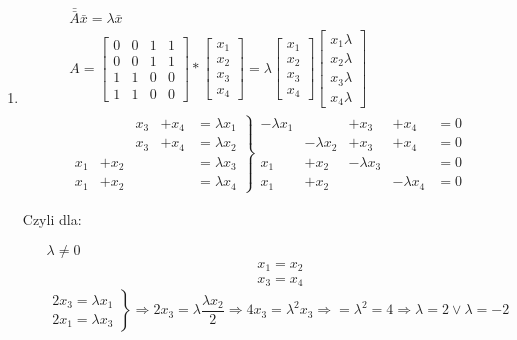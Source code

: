 \begin{example*}
\begin{enumerate}[label=\Roman*.]
\item \begin{align*}
&\bar{\bar{A}}\bar{x}=\lambda \bar{x} \\
&A=\begin{bmatrix}
0&0&1&1\\
0&0&1&1\\
1&1&0&0\\
1&1&0&0
\end{bmatrix}*\begin{bmatrix}
x_1\\x_2\\x_3\\x_4
\end{bmatrix}=\lambda \begin{bmatrix}
x_1\\x_2\\x_3\\x_4
\end{bmatrix}\begin{bmatrix}
x_1\lambda\\x_2\lambda\\x_3\lambda\\x_4\lambda
\end{bmatrix}\\
&\left.\begin{matrix}
&&x_3 &+x_4 &= \lambda x_1\\
&&x_3 &+x_4 &= \lambda x_2\\
x_1 &+ x_2 &&&= \lambda x_3\\
x_1 &+ x_2 &&&= \lambda x_4
\end{matrix}\right\}\begin{matrix}
-\lambda x_1 & &+x_3 &+x_4 &=0\\
&-\lambda x_2 &+x_3 &+x_4 &=0\\
x_1 &+ x_2 &-\lambda x_3 &&=0\\
x_1 &+ x_2 &&-\lambda x_4 &=0
\end{matrix}
\end{align*}

\newpage
Czyli dla:
\begin{itemize}
\item[$\lambda \neq 0$] 
\begin{align*}
&x_1=x_2\\
&x_3=x_4
\end{align*}
$$\left. \begin{matrix}
2x_3=\lambda x_1\\
2x_1=\lambda x_3
\end{matrix}\right\}\Rightarrow 2x_3=\lambda \frac{\lambda x_2}{2} \Rightarrow 4x_3=\lambda ^2 x_3\Rightarrow =\lambda ^2=4\Rightarrow \lambda = 2 \lor \lambda = -2$$


\end{itemize}
\end{enumerate}
\end{example*}
